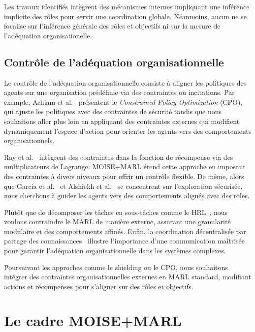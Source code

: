 \documentclass[dissemination]{jfsma}
\begin{document}
Les travaux identifiés intègrent des mécanismes internes impliquant une inférence  implicite des rôles pour servir une coordination globale. Néanmoins, aucun ne se focalise sur l'inférence générale des rôles et objectifs ni sur la mesure de l'adéquation organisationelle.

\subsection{Contrôle de l'adéquation organisationnelle}

Le contrôle de l'adéquation organisationnelle consiste à aligner les politiques des agents sur une organisation prédéfinie via des contraintes ou incitations. Par exemple, Achiam et al.~\cite{achiam2017cpo} présentent le \textit{Constrained Policy Optimization} (CPO), qui ajuste les politiques avec des contraintes de sécurité tandis que nous souhaitons aller plus loin en appliquant des contraintes externes qui modifient dynamiquement l'espace d'action pour orienter les agents vers des comportements organisationnels.

Ray et al.~\cite{ray2019benchmarking} intègrent des contraintes dans la fonction de récompense via des multiplicateurs de Lagrange. MOISE+MARL étend cette approche en imposant des contraintes à divers niveaux pour offrir un contrôle flexible. De même, alors que Garcia et al.~\cite{garcia2015comprehensive} et Alshiekh et al.~\cite{alshiekh2018safe} se concentrent sur l'exploration sécurisée, nous cherchons à guider les agents vers des comportements alignés avec des rôles.

Plutôt que de décomposer les tâches en sous-tâches comme le HRL~\cite{ghavamzadeh2006hrl}, nous voulons contraindre le MARL de manière externe, assurant une granularité modulaire et des comportements affinés. Enfin, la coordination décentralisée par partage des connaissances~\cite{foerster2018communication} illustre l'importance d'une communication maîtrisée pour garantir l'adéquation organisationnelle dans les systèmes complexes.

Poursuivant les approches comme le shielding ou le CPO, nous souhaitons intégrer des contraintes organisationnelles externes en MARL standard, modifiant actions et récompenses pour s'aligner sur des rôles et objectifs.


\section{Le cadre MOISE+MARL}
\label{sec:moise_marl_framework}
\end{document}
